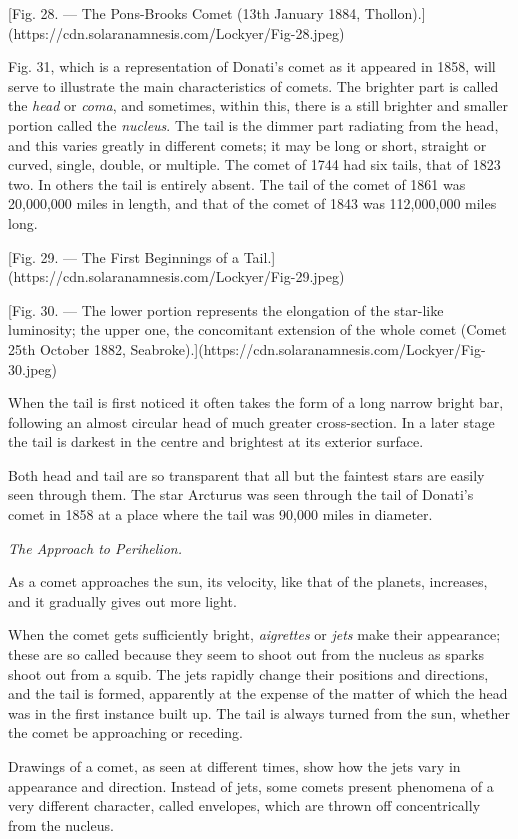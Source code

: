 \documentclass[a4paper, 12pt, oneside, polutonikogreek, english]{article}
\begin{document}
[Fig. 28. --- The Pons-Brooks Comet (13th January 1884, Thollon).](https://cdn.solaranamnesis.com/Lockyer/Fig-28.jpeg)

Fig. 31, which is a representation of Donati's comet as it appeared in 1858, will serve to illustrate the main characteristics of comets. The brighter part is called the \emph{head} or \emph{coma}, and sometimes, within this, there is a still brighter and smaller portion called the \emph{nucleus}. The tail is the dimmer part radiating from the head, and this varies greatly in different comets; it may be long or short, straight or curved, single, double, or multiple. The comet of 1744 had six tails, that of 1823 two. In others the tail is entirely absent. The tail of the comet of 1861 was 20,000,000 miles in length, and that of the comet of 1843 was 112,000,000 miles long.

[Fig. 29. --- The First Beginnings of a Tail.](https://cdn.solaranamnesis.com/Lockyer/Fig-29.jpeg)

[Fig. 30. --- The lower portion represents the elongation of the star-like luminosity; the upper one, the concomitant extension of the whole comet (Comet 25th October 1882, Seabroke).](https://cdn.solaranamnesis.com/Lockyer/Fig-30.jpeg)

When the tail is first noticed it often takes the form of a long narrow bright bar, following an almost circular head of much greater cross-section. In a later stage the tail is darkest in the centre and brightest at its exterior surface.

Both head and tail are so transparent that all but the faintest stars are easily seen through them. The star Arcturus was seen through the tail of Donati's comet in 1858 at a place where the tail was 90,000 miles in diameter.

\emph{The Approach to Perihelion.}

As a comet approaches the sun, its velocity, like that of the planets, increases, and it gradually gives out more light.

When the comet gets sufficiently bright, \emph{aigrettes} or \emph{jets} make their appearance; these are so called because they seem to shoot out from the nucleus as sparks shoot out from a squib. The jets rapidly change their positions and directions, and the tail is formed, apparently at the expense of the matter of which the head was in the first instance built up. The tail is always turned from the sun, whether the comet be approaching or receding.

Drawings of a comet, as seen at different times, show how the jets vary in appearance and direction. Instead of jets, some comets present phenomena of a very different character, called envelopes, which are thrown off concentrically from the nucleus.
\end{document}
